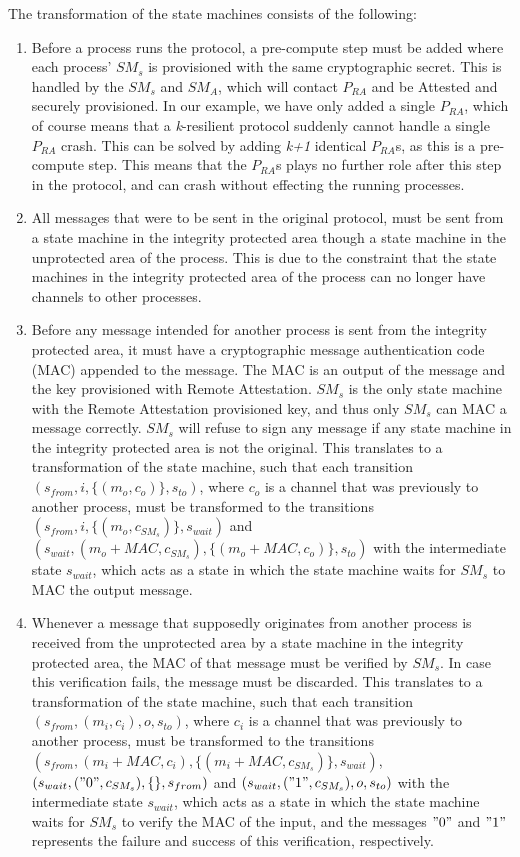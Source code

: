 \documentclass{article}
\begin{document}
	The transformation of the state machines consists of the following:
	\begin{enumerate}
		\item Before a process runs the protocol, a pre-compute step must be added where each process' $SM_s$ is provisioned with the same cryptographic secret.
		This is handled by the $SM_s$ and $SM_A$, which will contact $P_{RA}$ and be Attested and securely provisioned.
		In our example, we have only added a single $P_{RA}$, which of course means that a \textit{k}-resilient protocol suddenly cannot handle a single $P_{RA}$ crash.
		This can be solved by adding \textit{k+1} identical $P_{RA}$s, as this is a pre-compute step.
		This means that the $P_{RA}$s plays no further role after this step in the protocol, and can crash without effecting the running processes.
		\item All messages that were to be sent in the original protocol, must be sent from a state machine in the integrity protected area though a state machine in the unprotected area of the process.
		This is due to the constraint that the state machines in the integrity protected area of the process can no longer have channels to other processes.
		\item Before any message intended for another process is sent from the integrity protected area, it must have a cryptographic message authentication code (MAC) appended to the message.
		The MAC is an output of the message and the key provisioned with Remote Attestation.
		$SM_s$ is the only state machine with the Remote Attestation provisioned key, and thus only $SM_s$ can MAC a message correctly.
		$SM_s$ will refuse to sign any message if any state machine in the integrity protected area is not the original.
		This translates to a transformation of the state machine, such that each transition $(s_{from}, i, \{(m_o, c_o)\}, s_{to})$, where $c_o$ is a channel that was previously to another process, must be transformed to the transitions $(s_{from}, i, \{(m_o, c_{SM_s})\}, s_{wait})$ and $(s_{wait}, (m_o+MAC, c_{SM_s}), \{(m_o+MAC, c_o)\}, s_{to})$ with the intermediate state $s_{wait}$, which acts as a state in which the state machine waits for $SM_s$ to MAC the output message.
		\item Whenever a message that supposedly originates from another process is received from the unprotected area  by a state machine in the integrity protected area, the MAC of that message must be verified by $SM_s$.
		In case this verification fails, the message must be discarded.
		This translates to a transformation of the state machine, such that each transition $(s_{from}, (m_i, c_i), o, s_{to})$, where $c_i$ is a channel that was previously to another process, must be transformed to the transitions $(s_{from}, (m_i+MAC, c_i), \{(m_i+MAC, c_{SM_s})\}, s_{wait})$, $(s_{wait}, ("0", c_{SM_s}), \{\}, s_{from})$ and  $(s_{wait}, ("1", c_{SM_s}), o, s_{to})$ with the intermediate state $s_{wait}$, which acts as a state in which the state machine waits for $SM_s$ to verify the MAC of the input, and the messages $"0"$ and $"1"$ represents the failure and success of this verification, respectively.

\end{enumerate}
\end{document}
